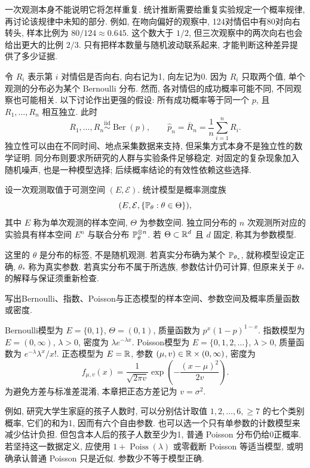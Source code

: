 一次观测本身不能说明它将怎样重复. 统计推断需要给重复实验规定一个概率规律, 再讨论该规律中未知的部分. 例如, 在吻向偏好的观察中, 124对情侣中有80对向右转头, 样本比例为 $80/124\approx0.645$. 这个数大于 $1/2$, 但三次观察中的两次向右也会给出更大的比例 $2/3$. 只有把样本数量与随机波动联系起来, 才能判断这种差异提供了多少证据.

令 $R_i$ 表示第 $i$ 对情侣是否向右, 向右记为1, 向左记为0. 因为 $R_i$ 只取两个值, 单个观测的分布必为某个 Bernoulli 分布. 然而, 各对情侣的成功概率可能不同, 不同观察也可能相关. 以下讨论作出更强的假设: 所有成功概率等于同一个 $p$, 且 $R_1,\ldots,R_n$ 相互独立. 此时
\[
 R_1,\ldots,R_n\overset{\mathrm{iid}}\sim\operatorname{Ber}(p),\qquad
 \widehat p_n=\overline R_n=\frac1n\sum_{i=1}^nR_i.
\]
独立性可以由在不同时间、地点采集数据来支持, 但采集方式本身不是独立性的数学证明. 同分布则要求所研究的人群与实验条件足够稳定. 对固定的复杂现象加入随机噪声, 也是一种模型选择; 后续概率结论的有效性依赖这些选择.

\begin{definition}[统计模型]
设一次观测取值于可测空间 $(E,\mathcal E)$. 统计模型是概率测度族
\[
 (E,\mathcal E,\{\mathbb P_\theta:\theta\in\Theta\}),
\]
其中 $E$ 称为单次观测的样本空间, $\Theta$ 为参数空间. 独立同分布的 $n$ 次观测所对应的实验具有样本空间 $E^n$ 与联合分布 $\mathbb P_\theta^{\otimes n}$. 若 $\Theta\subset\mathbb R^d$ 且 $d$ 固定, 称其为参数模型.
\end{definition}
这里的 $\theta$ 是分布的标签, 不是随机观测. 若真实分布确为某个 $\mathbb P_{\theta_*}$, 就称模型设定正确, $\theta_*$ 称为真实参数. 若真实分布不属于所选族, 参数估计仍可计算, 但原来关于 $\theta_*$ 的解释与保证须重新检查.

\begin{example}
写出Bernoulli、指数、Poisson与正态模型的样本空间、参数空间及概率质量函数或密度.
\end{example}
\begin{solution}
Bernoulli模型为 $E=\{0,1\}$, $\Theta=(0,1)$, 质量函数为 $p^x(1-p)^{1-x}$. 指数模型为 $E=(0,\infty)$, $\lambda>0$, 密度为 $\lambda e^{-\lambda x}$. Poisson模型为 $E=\{0,1,2,\ldots\}$, $\lambda>0$, 质量函数为 $e^{-\lambda}\lambda^x/x!$. 正态模型为 $E=\mathbb R$, 参数 $(\mu,v)\in\mathbb R\times(0,\infty)$, 密度为
\[
 f_{\mu,v}(x)=\frac1{\sqrt{2\pi v}}\exp\left(-\frac{(x-\mu)^2}{2v}\right).
\]
为避免方差与标准差混淆, 本章把正态方差记为 $v=\sigma^2$.
\end{solution}

例如, 研究大学生家庭的孩子人数时, 可以分别估计取值 $1,2,\ldots,6,\ge7$ 的七个类别概率, 它们的和为1, 因而有六个自由参数. 也可以选一个只有单参数的计数模型来减少估计负担. 但包含本人后的孩子人数至少为1, 普通 Poisson 分布仍给0正概率. 若坚持这一数据定义, 应使用 $1+\operatorname{Poiss}(\lambda)$ 或零截断 Poisson 等适当模型, 或明确承认普通 Poisson 只是近似. 参数少不等于模型正确.

